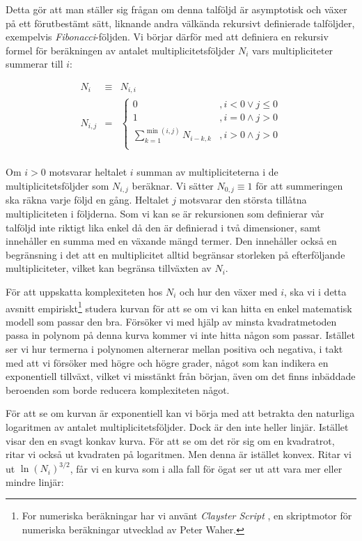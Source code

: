 Detta gör att man ställer sig frågan om denna talföljd är asymptotisk och växer på ett förutbestämt sätt, liknande andra välkända rekursivt definierade talföljder, exempelvis \emph{Fibonacci}-följden. Vi börjar därför med att definiera en rekursiv formel för beräkningen av antalet multiplicitetsföljder $N_i$ vars multipliciteter summerar till $i$:

\[
\begin{array}{rcl}
N_i & \equiv & N_{i,i} \\[5pt]
N_{i,j} & = & \left\{
\begin{array}{ll}
0 & , i < 0 \vee j \leq 0\\[5pt]
1 & ,i=0 \wedge j > 0\\[5pt]
\displaystyle\sum_{k=1}^{\min(i,j)}N_{i-k,k} & ,i>0 \wedge j>0\\
\end{array}
\right.\\
\end{array}
\]

Om $i>0$ motsvarar heltalet $i$ summan av multipliciteterna i de multiplicitetsföljder som $N_{i,j}$ beräknar. Vi sätter $N_{0,j} \equiv 1$ för att summeringen ska räkna varje följd en gång. Heltalet $j$ motsvarar den största tillåtna multipliciteten i följderna. Som vi kan se är rekursionen som definierar vår talföljd inte riktigt lika enkel då den är definierad i två dimensioner, samt innehåller en summa med en växande mängd termer. Den innehåller också en begränsning i det att en multiplicitet alltid begränsar storleken på efterföljande multipliciteter, vilket kan begränsa tillväxten av $N_i$.

För att uppskatta komplexiteten hos $N_i$ och hur den växer med $i$, ska vi i detta avsnitt empiriskt\footnote{For numeriska beräkningar har vi använt \emph{Clayster Script} \cite{ClaysterScript}, en skriptmotor för numeriska beräkningar utvecklad av Peter Waher.} studera kurvan för att se om vi kan hitta en enkel matematisk modell som passar den bra. Försöker vi med hjälp av minsta kvadratmetoden passa in polynom på denna kurva kommer vi inte hitta någon som passar. Istället ser vi hur termerna i polynomen alternerar mellan positiva och negativa, i takt med att vi försöker med högre och högre grader, något som kan indikera en exponentiell tillväxt, vilket vi misstänkt från början, även om det finns inbäddade beroenden som borde reducera komplexiteten något.

För att se om kurvan är exponentiell kan vi börja med att betrakta den naturliga logaritmen av antalet multiplicitetsföljder. Dock är den inte heller linjär. Istället visar den en svagt konkav kurva. För att se om det rör sig om en kvadratrot, ritar vi också ut kvadraten på logaritmen. Men denna är istället konvex. Ritar vi ut $\ln(N_i)^{3/2}$, får vi en kurva som i alla fall för ögat ser ut att vara mer eller mindre linjär:

